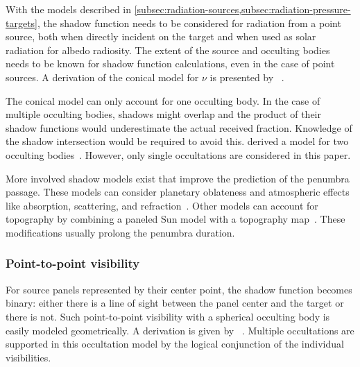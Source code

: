 With the models described in \cref{subsec:radiation-sources,subsec:radiation-pressure-targets}, the shadow function needs to be considered for radiation from a point source, both when directly incident on the target and when used as solar radiation for albedo radiosity. The extent of the source and occulting bodies needs to be known for shadow function calculations, even in the case of point sources. A derivation of the conical model for $\nu$ is presented by \citeauthor{Montenbruck2000}~\cite{Montenbruck2000}.

The conical model can only account for one occulting body. In the case of multiple occulting bodies, shadows might overlap and the product of their shadow functions would underestimate the actual received fraction. Knowledge of the shadow intersection would be required to avoid this. \citeauthor{Zhang2019} derived a model for two occulting bodies~\cite{Zhang2019}. However, only single occultations are considered in this paper.

More involved shadow models exist that improve the prediction of the penumbra passage. These models can consider planetary oblateness and atmospheric effects like absorption, scattering, and refraction~\cite{Li2019}. Other models can account for topography by combining a paneled Sun model with a topography map~\cite{Mazarico2018}. These modifications usually prolong the penumbra duration.


\subsubsection{Point-to-point visibility}
For source panels represented by their center point, the shadow function becomes binary: either there is a line of sight between the panel center and the target or there is not. Such point-to-point visibility with a spherical occulting body is easily modeled geometrically. A derivation is given by \citeauthor{Vallado2013}~\cite{Vallado2013}. Multiple occultations are supported in this occultation model by the logical conjunction of the individual visibilities.
